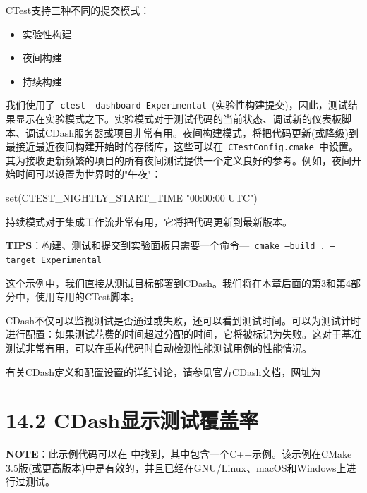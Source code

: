 
CTest支持三种不同的提交模式：

\begin{itemize}
\item 实验性构建

\item 夜间构建

\item 持续构建

\end{itemize}

我们使用了\texttt{ ctest --dashboard Experimental }(实验性构建提交)，因此，测试结果显示在实验模式之下。实验模式对于测试代码的当前状态、调试新的仪表板脚本、调试CDash服务器或项目非常有用。夜间构建模式，将把代码更新(或降级)到最接近最近夜间构建开始时的存储库，这些可以在\texttt{ CTestConfig.cmake }中设置。其为接收更新频繁的项目的所有夜间测试提供一个定义良好的参考。例如，夜间开始时间可以设置为世界时的"午夜"：

\begin{codebox}[cmake]
set(CTEST_NIGHTLY_START_TIME "00:00:00 UTC")
\end{codebox}

持续模式对于集成工作流非常有用，它将把代码更新到最新版本。

\begin{myInfoBox}
\textbf{TIPS}：构建、测试和提交到实验面板只需要一个命令—\texttt{ cmake --build . --target Experimental}
\end{myInfoBox}


这个示例中，我们直接从测试目标部署到CDash。我们将在本章后面的第3和第4部分中，使用专用的CTest脚本。

CDash不仅可以监视测试是否通过或失败，还可以看到测试时间。可以为测试计时进行配置：如果测试花费的时间超过分配的时间，它将被标记为失败。这对于基准测试非常有用，可以在重构代码时自动检测性能测试用例的性能情况。

有关CDash定义和配置设置的详细讨论，请参见官方CDash文档，网址为 


\section{14.2 CDash显示测试覆盖率}

\begin{myInfoBox}
\textbf{NOTE}：此示例代码可以在  中找到，其中包含一个C++示例。该示例在CMake 3.5版(或更高版本)中是有效的，并且已经在GNU/Linux、macOS和Windows上进行过测试。
\end{myInfoBox}

